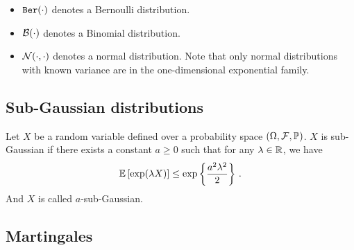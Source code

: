 \begin{itemize}
    \item $\texttt{Ber}(\cdot)$ denotes a Bernoulli distribution.
    \item $\mathcal{B}(\cdot)$ denotes a Binomial distribution.
    \item $\mathcal{N}(\cdot,\cdot)$ denotes a normal distribution. Note that only normal distributions with known variance are in the one-dimensional exponential family.
\end{itemize}


\subsection{Sub-Gaussian distributions}\label{app:maths.proba.subgaussian}

\begin{definition}
\begin{leftbar}[defnbar]
Let $X$ be a random variable defined over a probability space $(\Omega,\mathcal{F},\mathbb{P})$. $X$ is sub-Gaussian if there exists a constant $a\geq 0$ such that for any $\lambda\in\mathbb{R}$, we have
\[
    \mathbb{E}\left[\exp(\lambda X)\right] \leq \exp\left\{\frac{a^2\lambda^2}{2}\right\}\,.
\]
And $X$ is called $a$-sub-Gaussian.
\end{leftbar}
\end{definition}


\subsection{Martingales}\label{app:maths.proba.martingale}


